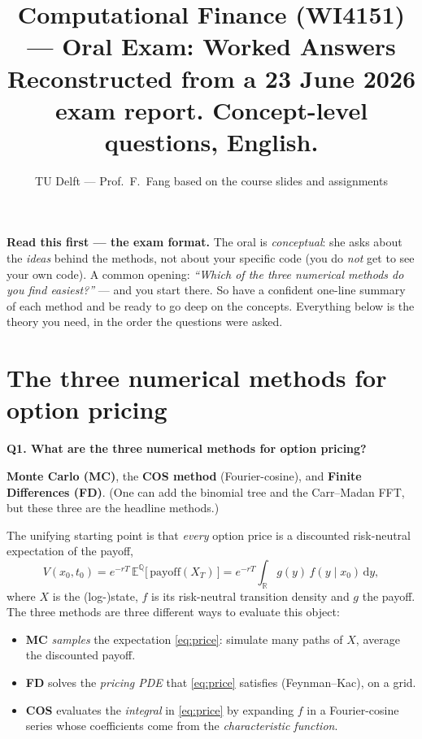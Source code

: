 \documentclass[11pt]{article}
\title{\textbf{Computational Finance (WI4151) --- Oral Exam: Worked Answers}\\[3pt]
\large Reconstructed from a 23 June 2026 exam report. Concept-level questions, English.}
\author{TU Delft --- Prof.\ F.\ Fang \quad\textbar\quad based on the course slides and assignments}
\date{}
\newcommand{\R}{\mathbb{R}}
\newcommand{\E}{\mathbb{E}}
\newcommand{\Q}{\mathbb{Q}}
\newcommand{\dd}{\,\mathrm{d}}
\newcommand{\Qhead}[1]{\bigskip\noindent\textbf{\large #1}\par\nobreak\smallskip}
\begin{document}
\maketitle
\vspace{-1.2em}

\begin{keybox}
\textbf{Read this first --- the exam format.} The oral is \emph{conceptual}: she asks about the \emph{ideas}
behind the methods, not about your specific code (you do \emph{not} get to see your own code). A common
opening: \emph{``Which of the three numerical methods do you find easiest?''} --- and you start there.
So have a confident one-line summary of each method and be ready to go deep on the concepts. Everything below
is the theory you need, in the order the questions were asked.
\end{keybox}

\tableofcontents
\bigskip

\section{The three numerical methods for option pricing}
\Qhead{Q1. What are the three numerical methods for option pricing?}

\textbf{Monte Carlo (MC)}, the \textbf{COS method} (Fourier-cosine), and \textbf{Finite Differences (FD)}.
(One can add the binomial tree and the Carr--Madan FFT, but these three are the headline methods.)

The unifying starting point is that \emph{every} option price is a discounted risk-neutral expectation of the
payoff,
\begin{equation}\label{eq:price}
V(x_0,t_0)=e^{-rT}\,\E^{\Q}\!\big[\,\text{payoff}(X_T)\,\big]
        =e^{-rT}\!\int_{\R} g(y)\,f(y\mid x_0)\dd y ,
\end{equation}
where $X$ is the (log-)state, $f$ is its risk-neutral transition density and $g$ the payoff. The three
methods are three different ways to evaluate this object:
\begin{itemize}
  \item \textbf{MC} \emph{samples} the expectation \eqref{eq:price}: simulate many paths of $X$, average the
  discounted payoff.
  \item \textbf{FD} solves the \emph{pricing PDE} that \eqref{eq:price} satisfies (Feynman--Kac), on a grid.
  \item \textbf{COS} evaluates the \emph{integral} in \eqref{eq:price} by expanding $f$ in a Fourier-cosine
  series whose coefficients come from the \emph{characteristic function}.
\end{itemize}
\end{document}
